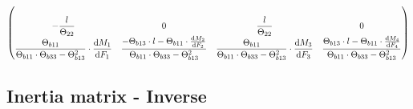 \begin{align*}
\begin{pmatrix}
		\\
			-\dfrac{l}{\Theta_{22}} & 0 & \dfrac{l}{\Theta_{22}} & 0
		\\
			\dfrac{\Theta_{b11}}{\Theta_{b11} \cdot \Theta_{b33} - \Theta_{b13}^2} \cdot \dfrac{\text{d}M_1}{\text{d}F_1} & \dfrac{-\Theta_{b13}\cdot l - \Theta_{b11} \cdot \frac{\text{d}M_2}{\text{d}F_2} }{\Theta_{b11} \cdot \Theta_{b33} - \Theta_{b13}^2} & \dfrac{\Theta_{b11}}{\Theta_{b11} \cdot \Theta_{b33} - \Theta_{b13}^2} \cdot \dfrac{\text{d}M_3}{\text{d}F_3} & \dfrac{\Theta_{b13}\cdot l - \Theta_{b11} \cdot \frac{\text{d}M_4}{\text{d}F_4} }{\Theta_{b11} \cdot \Theta_{b33} - \Theta_{b13}^2}
	\end{pmatrix}	
\end{align*}
\clearpage


\subsection{Inertia matrix - Inverse} \label{subsec:InertiaMatrix}

